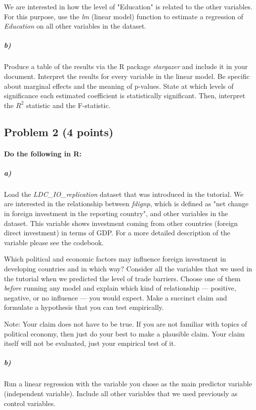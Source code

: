 \documentclass[12pt]{article}
\begin{document}
We are interested in how the level of "Education" is related to the other variables. For this purpose, use the \textit{lm} (linear model) function to estimate a regression of \textit{Education} on all other variables in the dataset.

\subparagraph{b)} Produce a table of the results via the R package \textit{stargazer} and include it in your document. Interpret the results for every variable in the linear model. Be specific about marginal effects and the meaning of p-values. State at which levels of significance each estimated coefficient is statistically significant. Then, interpret the $R^2$ statistic and the F-statistic.



\subsection*{Problem 2 (4 points)}

\paragraph{Do the following in R:}

\subparagraph{a)} Load the \textit{LDC\_IO\_replication} dataset that was introduced in the tutorial. We are interested in the relationship between \textit{fdignp}, which is defined as "net change in foreign investment in the reporting country", and other variables in the dataset. This variable shows investment coming from other countries (foreign direct investment) in terms of GDP. For a more detailed description of the variable please see the codebook.

Which political and economic factors may influence foreign investment in developing countries and in which way? Consider all the variables that we used in the tutorial when we predicted the level of trade barriers. Choose one of them \textit{before} running any model and explain which kind of relationship --- positive, negative, or no influence --- you would expect. Make a succinct claim and formulate a hypothesis that you can test empirically.

Note: Your claim does not have to be true. If you are not familiar with topics of political economy, then just do your best to make a plausible claim. Your claim itself will not be evaluated, just your empirical test of it.

\subparagraph{b)} Run a linear regression with the variable you chose as the main predictor variable (independent variable). Include all other variables that we used previously as control variables.
\end{document}

